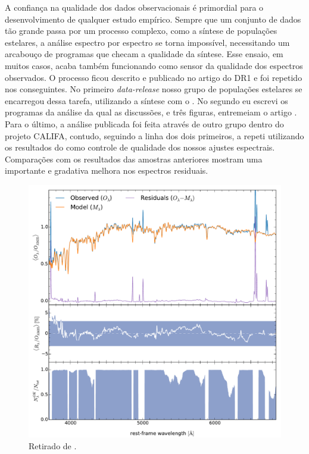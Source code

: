 A confiança na qualidade dos dados observacionais é primordial para o desenvolvimento de qualquer estudo empírico. Sempre que um conjunto de dados tão grande passa por um processo complexo, como a síntese de populações estelares, a análise espectro por espectro se torna impossível, necessitando um arcabouço de programas que checam a qualidade da síntese. Esse ensaio, em muitos casos, acaba também funcionando como sensor da qualidade dos espectros observados. O processo ficou descrito e publicado no artigo do DR1 e foi repetido nos conseguintes. No primeiro {\em data-release} nosso grupo de populações estelares se encarregou dessa tarefa, utilizando a síntese com o \starlight. No segundo eu escrevi os programas da análise da qual as discussões, e três figuras, entremeiam o artigo \citep{GarciaBenito.etal.2015a}. Para o último, a análise publicada foi feita através de outro grupo dentro do projeto CALIFA, contudo, seguindo a linha dos dois primeiros, a repeti utilizando os resultados do \starlight como controle de qualidade dos nossos ajustes espectrais. Comparações com os resultados das amostras anteriores mostram uma importante e gradativa melhora nos espectros residuais.

\begin{figure}
	\centering
	\includegraphics[scale=0.6]{figuras/DR2_spectral_residuals.pdf}
	\caption[DR2: Espectros médios: observado, sintétio e residual]
	{Retirado de \citet{GarciaBenito.etal.2015a}.}
  \label{fig:obs_syn_res}
\end{figure}

